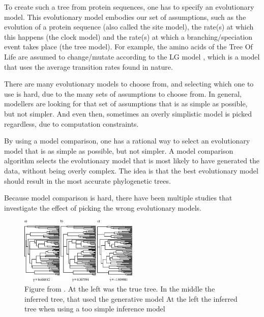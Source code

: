 To create such a tree from protein sequences, one has to specify
an evolutionary model. This evolutionary model embodies our set of
assumptions,
such as the evolution of a protein sequence (also called the site model), 
the rate(s) at which this happens (the clock model) 
and the rate(s) at which a branching/speciation event takes 
place (the tree model). 
For example, the amino acids of the Tree Of Life are assumed to change/mutate
according to the LG model \cite{le2008improved}, 
which is a model that uses the average transition rates found in nature.

There are many evolutionary models to choose from, 
and selecting which one to use is hard, due to the many sets of assumptions
to choose from. In general, modellers are looking for that set of assumptions
that is as simple as possible, but not simpler. And even then, sometimes
an overly simplistic model is picked regardless, due to computation 
constraints. 

By using a model comparison, one has a rational way to select 
an evolutionary model that is as simple as possible, but not simpler.
A model comparison algorithm selects the evolutionary model that is
most likely to have generated the data, without being overly complex.
The idea is that the best evolutionary model should result in the
most accurate phylogenetic trees.

Because model comparison is hard, there have been multiple
studies that investigate the effect of picking the wrong
evolutionary models. 

\begin{figure}[H]
  \includegraphics[width=0.5\textwidth]{revell2005under.png}
  \caption{
    Figure from \cite{revell2005under}. At the left was the true tree.
    In the middle the inferred tree, that used the generative model
    At the left the inferred tree when using a too simple inference model 
 }
  \label{fig:revell2005under}
\end{figure}

